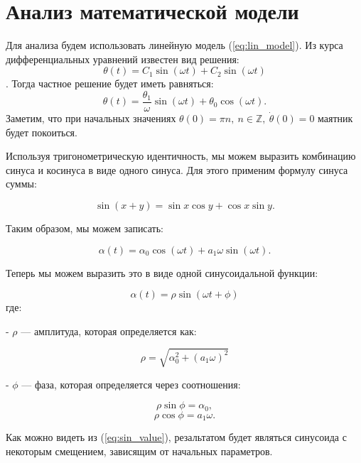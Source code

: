\chapter{Анализ математической модели}
Для анализа будем использовать линейную модель (\ref{eq:lin_model}).
Из курса дифференциальных уравнений известен вид решения:
$$\theta(t) = C_1 \sin(\omega t) + C_2 \sin(\omega t)$$.
Тогда частное решение будет иметь равняться:
$$\theta(t) = \frac{\theta_1}{\omega} \sin(\omega t) + \theta_0 \cos(\omega t).$$
Заметим, что при начальных значениях $\theta(0) = \pi n, \ n \in \mathbb{Z}, \ \dot{\theta}(0) = 0$ маятник будет покоиться.

Используя тригонометрическую идентичность, мы можем выразить комбинацию синуса и косинуса в виде одного синуса. Для этого применим формулу синуса суммы:

\[
\sin(x + y) = \sin x \cos y + \cos x \sin y.
\]

Таким образом, мы можем записать:

\[
\alpha(t) = \alpha_0 \cos(\omega t) + a_1 \omega \sin(\omega t).
\]

Теперь мы можем выразить это в виде одной синусоидальной функции:

\begin{equation}
	\alpha(t) = \rho \sin(\omega t + \phi)
	\label{eq:sin_value}
\end{equation}
где:

- \(\rho\) — амплитуда, которая определяется как:

\[
\rho = \sqrt{\alpha_0^2 + (a_1 \omega)^2}
\]

- \(\phi\) — фаза, которая определяется через соотношения:

\[
\rho \sin \phi = \alpha_0,
\]
\[
\rho \cos \phi = a_1 \omega.
\]

Как можно видеть из (\ref{eq:sin_value}), резальтатом будет являться синусоида с некоторым смещением, зависящим от начальных параметров.
